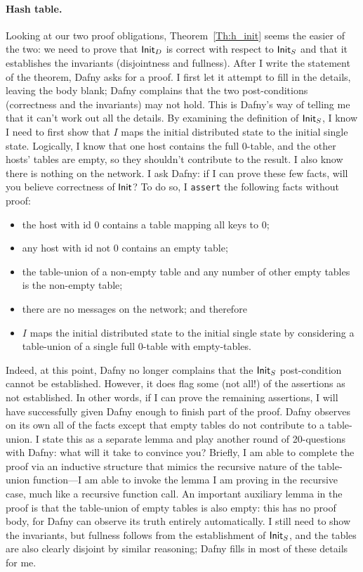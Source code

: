 \paragraph{Hash table.} Looking at our two proof obligations,
Theorem~\ref{Th:h_init} seems the easier of the two: we need to prove that
\(\mathsf{Init}_{D}\) is correct with respect to \(\mathsf{Init}_{S}\) and that it
establishes the invariants (disjointness and fullness). After I write the
statement of the theorem, Dafny asks for a proof. I first let it attempt to fill
in the details, leaving the body blank; Dafny complains that the two
post-conditions (correctness and the invariants) may not hold. This is Dafny's
way of telling me that it can't work out all the details. By examining the
definition of \(\mathsf{Init}_{S}\), I know I need to first show that \(I\) maps
the initial distributed state to the initial single state. Logically, I know
that one host contains the full 0-table, and the other hosts' tables are empty,
so they shouldn't contribute to the result. I also know there is nothing on the
network. I ask Dafny: if I can prove these few facts, will you believe
correctness of \(\mathsf{Init}\)? To do so, I \texttt{assert} the following facts
without proof:
\begin{itemize}
    \item the host with id 0 contains a table mapping all keys to 0;
    \item any host with id not 0 contains an empty table;
    \item the table-union of a non-empty table and any number of other empty
        tables is the non-empty table;
    \item there are no messages on the network; and therefore
    \item \(I\) maps the initial distributed state to the initial single state
        by considering a table-union of a single full 0-table with empty-tables.
\end{itemize}
Indeed, at this point, Dafny no longer complains that the \(\mathsf{Init}_{S}\)
post-condition cannot be established. However, it does flag some (not all!) of
the assertions as not established. In other words, if I can prove the remaining
assertions, I will have successfully given Dafny enough to finish part of the
proof. Dafny observes on its own all of the facts except that empty tables do
not contribute to a table-union. I state this as a separate lemma and play
another round of 20-questions with Dafny: what will it take to convince you?
Briefly, I am able to complete the proof via an inductive structure that mimics
the recursive nature of the table-union function---I am able to invoke the lemma
I am proving in the recursive case, much like a recursive function call. An
important auxiliary lemma in the proof is that the table-union of empty tables
is also empty: this has no proof body, for Dafny can observe its truth entirely
automatically. I still need to show the invariants, but fullness follows from
the establishment of \(\mathsf{Init}_{S}\), and the tables are also clearly
disjoint by similar reasoning; Dafny fills in most of these details for me.

